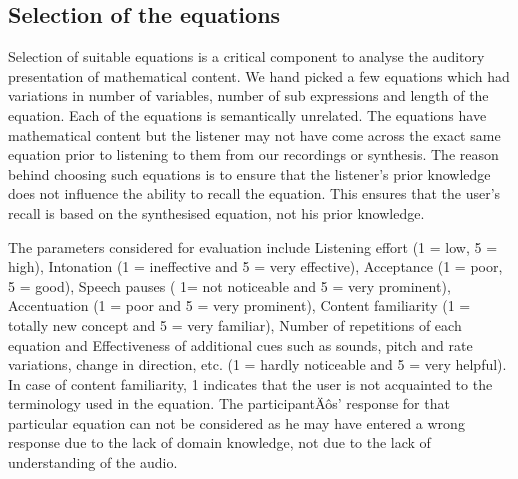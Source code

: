 \documentclass{article}
\begin{document}
\subsection{Selection of the equations}
\label{ssec:equations}

Selection  of suitable equations is a critical component to analyse the auditory presentation of mathematical content. We hand picked a few equations which had variations in number of variables, number of sub expressions and length of the equation.  Each of the equations is semantically unrelated. The equations have mathematical content but the listener may not have come across the exact same equation prior to listening to them from our recordings or synthesis. The reason behind choosing such equations is to ensure that the listener's prior knowledge does not influence the ability to recall the equation. This ensures that the user's recall is based on the synthesised equation, not his prior knowledge.

The parameters considered for evaluation include Listening effort (1 = low, 5 = high), Intonation (1 = ineffective and 5 = very effective), Acceptance (1 = poor, 5 = good), Speech pauses ( 1= not noticeable and 5 = very prominent), Accentuation (1 = poor and 5 = very prominent), Content familiarity (1 = totally new concept and 5 = very familiar), Number of repetitions of each equation and Effectiveness of additional cues such as sounds, pitch and rate variations, change in direction, etc. (1 = hardly noticeable and 5 = very helpful). In case of content familiarity, 1 indicates that the user is not acquainted to the terminology used in the equation. The participantÄôs' response for that particular equation can not be considered as he may have entered a wrong response due to the lack of domain knowledge, not due to the lack of understanding of the audio.
\end{document}
